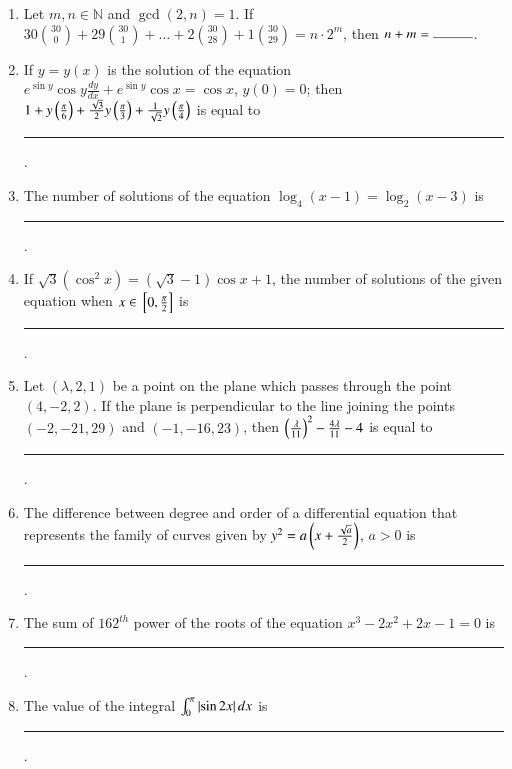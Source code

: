 \documentclass[journal]{IEEEtran}
\begin{document}
\begin{enumerate}
    \item Let $m, n \in \mathbb{N}$ and $\gcd(2, n) = 1$. If
    $30\binom{30}{0} + 29\binom{30}{1} + \dots + 2\binom{30}{28} + 1\binom{30}{29} = n \cdot 2^m$,
    then $n + m = \rule{1cm}{0.15mm}$.

    \item If $y = y(x)$ is the solution of the equation $e^{\sin y}\cos y \frac{dy}{dx} + e^{\sin y}\cos x = \cos x$,
    $y(0) = 0$; then $1 + y\left(\frac{\pi}{6}\right) + \frac{\sqrt{3}}{2} y\left(\frac{\pi}{3}\right) + \frac{1}{\sqrt{2}} y\left(\frac{\pi}{4}\right)$
    is equal to \rule{1cm}{0.15mm}.

    \item The number of solutions of the equation $\log_4(x - 1) = \log_2(x - 3)$ is \rule{1cm}{0.15mm}.
    
    \item If $\sqrt{3}(\cos^2 x) = (\sqrt{3} - 1) \cos x + 1$, the number of solutions
    of the given equation when $x \in {}\left[0, \frac{\pi}{2}\right]$ is \rule{1cm}{0.15mm}.

    \item Let $(\lambda, 2, 1)$ be a point on the plane which passes through the point
    $(4, -2, 2)$. If the plane is perpendicular to the line joining the points
    $(-2, -21, 29)$ and $(-1, -16, 23)$, then $\left(\frac{\lambda}{11}\right)^2 - \frac{4\lambda}{11} - 4$
    is equal to \rule{1cm}{0.15mm}.

    \item The difference between degree and order of a differential equation that
    represents the family of curves given by $y^2 = a \left(x + \frac{\sqrt{a}}{2}\right)$,
    $a > 0$ is \rule{1cm}{0.15mm}.

    \item The sum of $162^{th}$ power of the roots of the equation
    $x^3 - 2x^2 + 2x - 1 = 0$ is \rule{1cm}{0.15mm}.

    \item The value of the integral $\int_0^\pi \left\vert\sin 2x\right\vert dx$ is \rule{1cm}{0.15mm}.

\end{enumerate}
\end{document}
